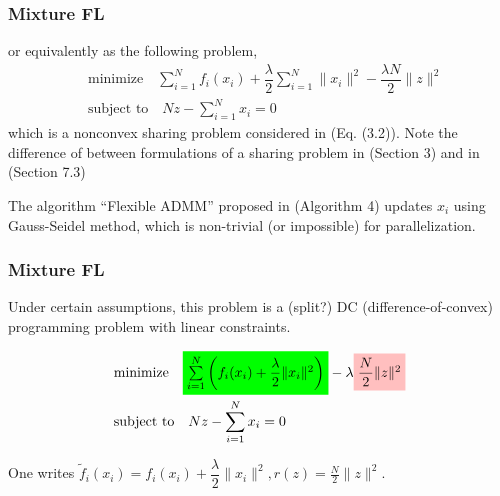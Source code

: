 \begin{frame}
\frametitle{Mixture FL}

or equivalently as the following problem,
\begin{align*}
    & \text{minimize} \quad \sum\limits_{i=1}^N f_i(x_i) + \dfrac{\lambda}{2} \sum\limits_{i=1}^N \lVert x_i \rVert^2 -\dfrac{\lambda N}{2} \lVert z \rVert^2 \\
    & \text{subject to} \quad Nz - \sum\limits_{i=1}^N x_i = 0
\end{align*}
which is a nonconvex sharing problem considered in \cite{hong2016convergence} (Eq. (3.2)). Note the difference of between formulations of a sharing problem in \cite{hong2016convergence} (Section 3) and in \cite{boyd2011distributed} (Section 7.3)

\vspace{0.8em}

The algorithm ``Flexible ADMM'' proposed in \cite{hong2016convergence} (Algorithm 4) updates $x_i$ using Gauss-Seidel method, which is non-trivial (or impossible) for parallelization.

\end{frame}


\begin{frame}
\frametitle{Mixture FL}

Under certain assumptions, this problem is a (split?) DC (difference-of-convex) programming problem {\color{red} with linear constraints}.

\begin{align*}
    & \text{minimize} \quad \colorbox{green}{$\sum\limits_{i=1}^N \left( f_i(x_i) + \dfrac{\lambda}{2} \lVert x_i \rVert^2 \right)$} - \lambda \colorbox{pink}{$\dfrac{N}{2} \lVert z \rVert^2$} \\
    & \text{subject to} \quad Nz - \sum\limits_{i=1}^N x_i = 0
\end{align*}

One writes $\widetilde{f}_i (x_i) =  f_i(x_i) + \dfrac{\lambda}{2} \lVert x_i \rVert^2, r(z) = \frac{N}{2} \lVert z \rVert^2$.

\end{frame}

